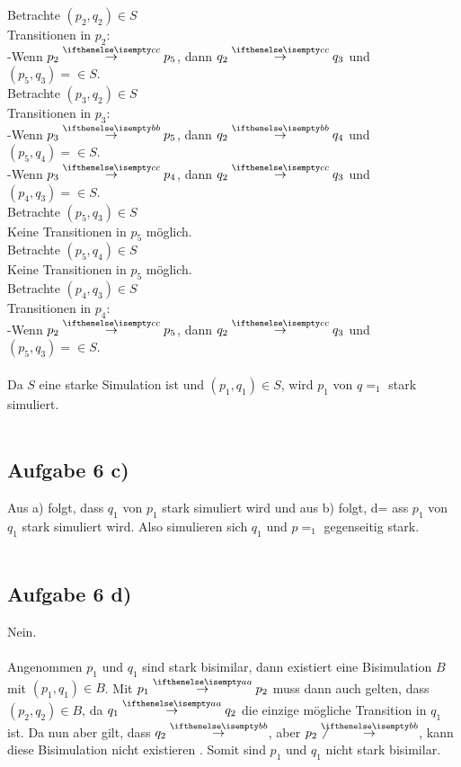 Betrachte $(p_2, q_2) \in S$\\
Transitionen in $p_2$:\\
-Wenn $p_2 \CCSTrans {c} p_5$, dann $q_2 \CCSTrans {c} q_3$ und $(p_5, q_3)=
 \in S$.\\

Betrachte $(p_3, q_2) \in S$\\
Transitionen in $p_3$:\\
-Wenn $p_3 \CCSTrans {b} p_5$, dann $q_2 \CCSTrans {b} q_4$ und $(p_5, q_4)=
 \in S$.\\
-Wenn $p_3 \CCSTrans {c} p_4$, dann $q_2 \CCSTrans {c} q_3$ und $(p_4, q_3)=
 \in S$.\\

Betrachte $(p_5, q_3) \in S$\\
Keine Transitionen in $p_5$ möglich.\\

Betrachte $(p_5, q_4) \in S$\\
Keine Transitionen in $p_5$ möglich.\\

Betrachte $(p_4, q_3) \in S$\\
Transitionen in $p_4$:\\
-Wenn $p_2 \CCSTrans {c} p_5$, dann $q_2 \CCSTrans {c} q_3$ und $(p_5, q_3)=
 \in S$.\\\\
Da $S$ eine starke Simulation ist und $(p_1, q_1) \in S$, wird $p_1$ von $q=
_1$ stark simuliert.
\\\\
\subsection*{Aufgabe 6 c)}
Aus a) folgt, dass $q_1$ von $p_1$ stark simuliert wird und aus b) folgt, d=
ass $p_1$ von $q_1$ stark simuliert wird. Also simulieren sich $q_1$ und $p=
_1$ gegenseitig stark.\\\\
\subsection*{Aufgabe 6 d)}
Nein.\\\\
Angenommen $p_1$ und $q_1$ sind stark bisimilar, dann existiert eine Bisimulation $B$ mit $(p_1, q_1) \in B$. Mit $p_1 \CCSTrans {a} p_2$ muss dann auch gelten, dass $(p_2, q_2) \in B$, da $q_1 \CCSTrans {a} q_2$ die einzige
mögliche Transition in $q_1$ ist. 
Da nun aber gilt, dass $q_2 \CCSTrans {b}$, aber $p_2 \NCCSTrans {b}$, kann diese Bisimulation nicht existieren
. Somit sind $p_1$ und $q_1$ nicht stark bisimilar.
\\\\